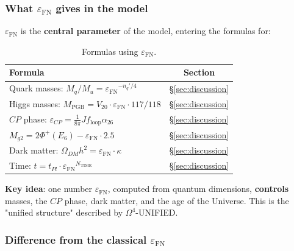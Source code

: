 \documentclass[11pt,a4paper]{article}
\newcommand{\Om}{\ensuremath{\Omega^4}}
\newcommand{\epsFN}{\ensuremath{\varepsilon_{\text{FN}}}}
\theoremstyle{definition}
\begin{document}
\subsubsection{What \texorpdfstring{$\epsFN$}{} gives in the model}

$\epsFN$ is the \textbf{central parameter} of the model, entering
the formulas for:

\begin{table}[ht]
\centering
\caption{Formulas using \texorpdfstring{$\epsFN$}{}.}
\label{tab:eps-fn-uses}
\begin{tabular}{lc}
\toprule
Formula & Section \\
\midrule
Quark masses: $M_q/M_u = \epsFN^{-n_q'/4}$ & \S\ref{sec:discussion} \\
Higgs masses: $M_{\text{PGB}} = V_{20} \cdot \epsFN \cdot 117/118$ & \S\ref{sec:discussion} \\
$CP$ phase: $\varepsilon_{CP} = \frac{1}{8\pi} J f_{\text{loop}} \alpha_{26}$ & \S\ref{sec:discussion} \\
$M_{g2} = 2 \Phi^+(E_6) - \epsFN \cdot 2.5$ & \S\ref{sec:discussion} \\
Dark matter: $\Omega_{DM} h^2 = \epsFN \cdot \kappa$ & \S\ref{sec:discussion} \\
Time: $t = t_{Pl} \cdot \epsFN^{N_{\text{TIME}}}$ & \S\ref{sec:discussion} \\
\bottomrule
\end{tabular}
\end{table}

\textbf{Key idea}: one number $\epsFN$, computed
from quantum dimensions, \textbf{controls} masses, the $CP$ phase,
dark matter, and the age of the Universe. This is the "unified
structure" described by $\Om$-UNIFIED.

\subsubsection{Difference from the classical \texorpdfstring{$\varepsilon_{\text{FN}}$}{epsilon\_FN}}
\end{document}
